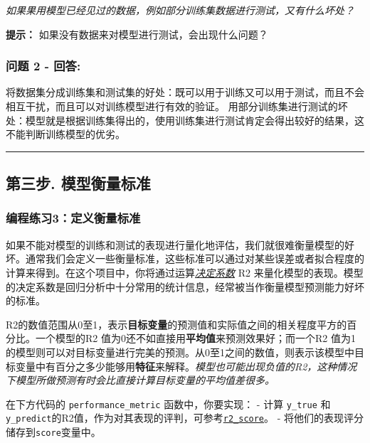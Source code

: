 \documentclass[11pt]{article}
\begin{document}
\emph{如果果用模型已经见过的数据，例如部分训练集数据进行测试，又有什么坏处？}

\textbf{提示：} 如果没有数据来对模型进行测试，会出现什么问题？

    \subsubsection{问题 2 - 回答:}\label{ux95eeux9898-2---ux56deux7b54}

将数据集分成训练集和测试集的好处：既可以用于训练又可以用于测试，而且不会相互干扰，而且可以对训练模型进行有效的验证。
用部分训练集进行测试的坏处：模型就是根据训练集得出的，使用训练集进行测试肯定会得出较好的结果，这不能判断训练模型的优劣。

    \begin{center}\rule{0.5\linewidth}{\linethickness}\end{center}

\subsection{第三步.
模型衡量标准}\label{ux7b2cux4e09ux6b65.-ux6a21ux578bux8861ux91cfux6807ux51c6}

    \subsubsection{编程练习3：定义衡量标准}\label{ux7f16ux7a0bux7ec3ux4e603ux5b9aux4e49ux8861ux91cfux6807ux51c6}

如果不能对模型的训练和测试的表现进行量化地评估，我们就很难衡量模型的好坏。通常我们会定义一些衡量标准，这些标准可以通过对某些误差或者拟合程度的计算来得到。在这个项目中，你将通过运算\href{http://stattrek.com/statistics/dictionary.aspx?definition=coefficient_of_determination}{\emph{决定系数}}
R2
来量化模型的表现。模型的决定系数是回归分析中十分常用的统计信息，经常被当作衡量模型预测能力好坏的标准。

R2的数值范围从0至1，表示\textbf{目标变量}的预测值和实际值之间的相关程度平方的百分比。一个模型的R2
值为0还不如直接用\textbf{平均值}来预测效果好；而一个R2
值为1的模型则可以对目标变量进行完美的预测。从0至1之间的数值，则表示该模型中目标变量中有百分之多少能够用\textbf{特征}来解释。\emph{模型也可能出现负值的R2，这种情况下模型所做预测有时会比直接计算目标变量的平均值差很多。}

在下方代码的 \texttt{performance\_metric} 函数中，你要实现： - 计算
\texttt{y\_true} 和
\texttt{y\_predict}的R2值，作为对其表现的评判，可参考\href{http://scikit-learn.org/stable/modules/generated/sklearn.metrics.r2_score.html}{\texttt{r2\_score}}。
- 将他们的表现评分储存到\texttt{score}变量中。
\end{document}
